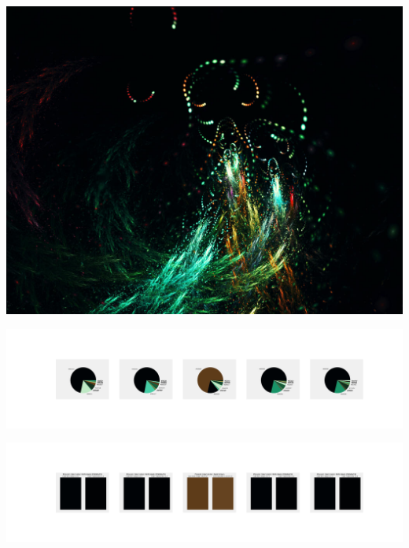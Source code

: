 \documentclass[11pt]{article}
\begin{document}
\begin{landscape}
    \begin{center}
    \includegraphics[width=\textwidth]{./nbimg/file (134).jpg}
    \end{center}

    \begin{center}
    \includegraphics[width=250mm]{./nbimg/pie-39.jpg}
    \end{center}

    \begin{center}
    \includegraphics[width=250mm]{./nbimg/peak-39.jpg}
    \end{center}
    


\end{landscape}
\end{document}
